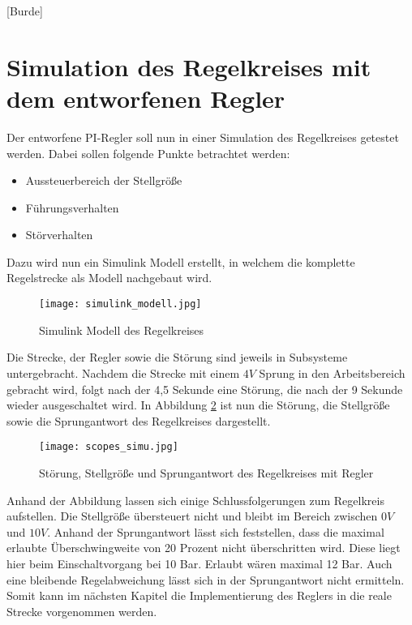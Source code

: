 
\newpage

[Burde]
\section{Simulation des Regelkreises mit dem entworfenen Regler} \label{Kapitel7}

Der entworfene PI-Regler soll nun in einer Simulation des Regelkreises getestet werden. Dabei sollen folgende Punkte betrachtet werden:

\begin{itemize}
\item Aussteuerbereich der Stellgröße

\item Führungsverhalten

\item Störverhalten
\end{itemize}

Dazu wird nun ein Simulink Modell erstellt, in welchem die komplette Regelstrecke als Modell nachgebaut wird. 

\begin{figure}[h]
	\begin{center}
		\texttt{[image: simulink\_modell.jpg]}
		\caption{Simulink Modell des Regelkreises}
       \label{simulink}
	\end{center} 
\end{figure}

Die Strecke, der Regler sowie die Störung sind jeweils in Subsysteme untergebracht. Nachdem die Strecke mit einem $4V$ Sprung in den Arbeitsbereich gebracht wird, folgt nach der 4,5 Sekunde eine Störung, die nach der 9 Sekunde wieder ausgeschaltet wird. In Abbildung \ref{scope_simu} ist nun die Störung, die Stellgröße sowie die Sprungantwort des Regelkreises dargestellt.

\newpage

\begin{figure}[h]
	\begin{center}
		\texttt{[image: scopes\_simu.jpg]}
		\caption{Störung, Stellgröße und Sprungantwort des Regelkreises mit Regler}
       \label{scope_simu}
	\end{center} 
\end{figure}

Anhand der Abbildung lassen sich einige Schlussfolgerungen zum Regelkreis aufstellen. Die Stellgröße übersteuert nicht und bleibt im Bereich zwischen $0V$ und $10V$. Anhand der Sprungantwort lässt sich feststellen, dass die maximal erlaubte Überschwingweite von 20 Prozent nicht überschritten wird. Diese liegt hier beim Einschaltvorgang bei 10 Bar. Erlaubt wären maximal 12 Bar. Auch eine bleibende Regelabweichung lässt sich in der Sprungantwort nicht ermitteln. Somit kann im nächsten Kapitel die Implementierung des Reglers in die reale Strecke vorgenommen werden.

